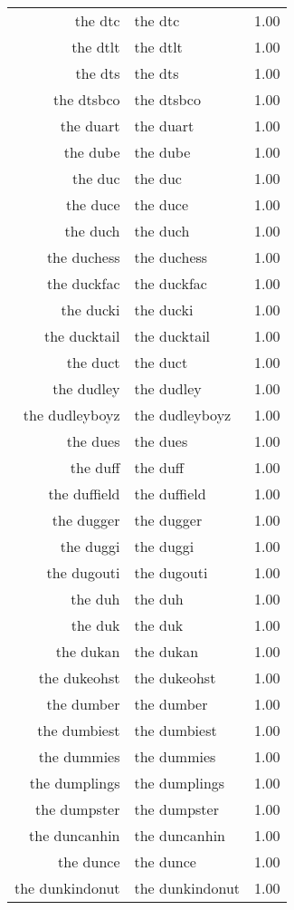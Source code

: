 \begin{table}[ht]
\begin{tabular}{rlr}
  the dtc & the dtc & 1.00 \\ 
  the dtlt & the dtlt & 1.00 \\ 
  the dts & the dts & 1.00 \\ 
  the dtsbco & the dtsbco & 1.00 \\ 
  the duart & the duart & 1.00 \\ 
  the dube & the dube & 1.00 \\ 
  the duc & the duc & 1.00 \\ 
  the duce & the duce & 1.00 \\ 
  the duch & the duch & 1.00 \\ 
  the duchess & the duchess & 1.00 \\ 
  the duckfac & the duckfac & 1.00 \\ 
  the ducki & the ducki & 1.00 \\ 
  the ducktail & the ducktail & 1.00 \\ 
  the duct & the duct & 1.00 \\ 
  the dudley & the dudley & 1.00 \\ 
  the dudleyboyz & the dudleyboyz & 1.00 \\ 
  the dues & the dues & 1.00 \\ 
  the duff & the duff & 1.00 \\ 
  the duffield & the duffield & 1.00 \\ 
  the dugger & the dugger & 1.00 \\ 
  the duggi & the duggi & 1.00 \\ 
  the dugouti & the dugouti & 1.00 \\ 
  the duh & the duh & 1.00 \\ 
  the duk & the duk & 1.00 \\ 
  the dukan & the dukan & 1.00 \\ 
  the dukeohst & the dukeohst & 1.00 \\ 
  the dumber & the dumber & 1.00 \\ 
  the dumbiest & the dumbiest & 1.00 \\ 
  the dummies & the dummies & 1.00 \\ 
  the dumplings & the dumplings & 1.00 \\ 
  the dumpster & the dumpster & 1.00 \\ 
  the duncanhin & the duncanhin & 1.00 \\ 
  the dunce & the dunce & 1.00 \\ 
  the dunkindonut & the dunkindonut & 1.00 \\ 

\end{tabular}
\end{table}
